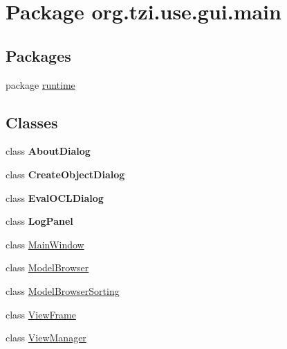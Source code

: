 \hypertarget{namespaceorg_1_1tzi_1_1use_1_1gui_1_1main}{\section{Package org.\-tzi.\-use.\-gui.\-main}
\label{namespaceorg_1_1tzi_1_1use_1_1gui_1_1main}
}
\subsection*{Packages}
\begin{DoxyCompactItemize}
\item 
package \hyperlink{namespaceorg_1_1tzi_1_1use_1_1gui_1_1main_1_1runtime}{runtime}
\end{DoxyCompactItemize}
\subsection*{Classes}
\begin{DoxyCompactItemize}
\item 
class {\bfseries About\-Dialog}
\item 
class {\bfseries Create\-Object\-Dialog}
\item 
class {\bfseries Eval\-O\-C\-L\-Dialog}
\item 
class {\bfseries Log\-Panel}
\item 
class \hyperlink{classorg_1_1tzi_1_1use_1_1gui_1_1main_1_1_main_window}{Main\-Window}
\item 
class \hyperlink{classorg_1_1tzi_1_1use_1_1gui_1_1main_1_1_model_browser}{Model\-Browser}
\item 
class \hyperlink{classorg_1_1tzi_1_1use_1_1gui_1_1main_1_1_model_browser_sorting}{Model\-Browser\-Sorting}
\item 
class \hyperlink{classorg_1_1tzi_1_1use_1_1gui_1_1main_1_1_view_frame}{View\-Frame}
\item 
class \hyperlink{classorg_1_1tzi_1_1use_1_1gui_1_1main_1_1_view_manager}{View\-Manager}
\end{DoxyCompactItemize}
